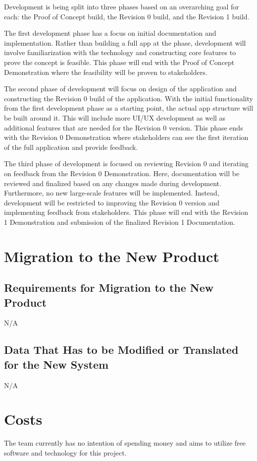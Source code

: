 \documentclass[12pt]{article}
\begin{document}
Development is being split into three phases based on an overarching goal for each: the Proof of Concept build,
the Revision 0 build, and the Revision 1 build. \par

The first development phase has a focus on initial documentation and implementation.
Rather than building a full app at the phase, development will involve familiarization with
the technology and constructing core features to prove the concept is feasible. This phase will
end with the Proof of Concept Demonstration where the feasibility will be proven to stakeholders. \par

The second phase of development will focus on design of the application and constructing the
Revision 0 build of the application. With the initial functionality from the first development phase as
a starting point, the actual app structure will be built around it. This will include more UI/UX
development as well as additional features that are needed for the Revision 0 version. This phase ends
with the Revision 0 Demonstration where stakeholders can see the first iteration of the full application
and provide feedback. \par

The third phase of development is focused on reviewing Revision 0 and iterating on feedback from the
Revision 0 Demonstration. Here, documentation will be reviewed and finalized based on any changes made
during development. Furthermore, no new large-scale features will be implemented. Instead, development
will be restricted to improving the Revision 0 version and implementing feedback from stakeholders. This phase
will end with the Revision 1 Demonstration and submission of the finalized Revision 1 Documentation.

\section{Migration to the New Product}
\subsection{Requirements for Migration to the New Product}
N/A
\subsection{Data That Has to be Modified or Translated for the New System}
N/A

\section{Costs}
The team currently has no intention of spending money and aims to utilize free software and technology
for this project.
\end{document}
